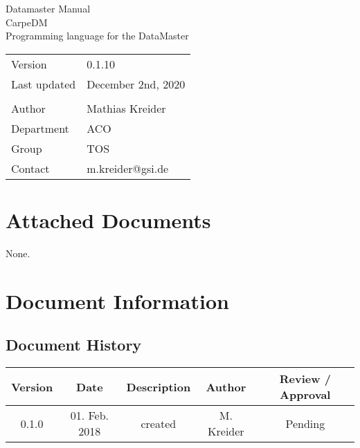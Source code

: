 \documentclass[12pt,a4paper]{report}
\makeatletter
\newcommand{\AppendixA}{dm_memmap}
\newcommand{\AppendixB}{dm_language}
\newcommand{\AppendixC}{dm_troubleshooting}
\newcommand{\DocAuthor}{Mathias Kreider}
\newcommand{\DocContact}{m.kreider@gsi.de}
\newcommand{\DocTitle}{CarpeDM\\Programming language for the DataMaster}
\newcommand{\DocName}{Datamaster Manual}
\newcommand{\DocRev}{December 2nd, 2020} %
\newcommand{\DocVer}{0.1.10}
\newcommand{\DocGroup}{TOS}
\newcommand{\DocDept}{ACO}
\newcommand{\DocHist}{
0.1.0 & 01. Feb. 2018 & created & M. Kreider & Pending\\
\hline
}
\makeatother
\begin{document}
\begin{titlepage}
\begin{center}
\vspace{2em} 

\Huge{\DocName}\\[2cm]
\Large{\DocTitle}\\[2cm] 

\begin{large}
\begin{tabularx}{\textwidth}{Xl}
Version & \DocVer\\
Last updated & \DocRev\\
\vspace{1.5cm}\\
Author & \DocAuthor\\
Department & \DocDept\\
Group & \DocGroup\\
Contact & \DocContact
\end{tabularx}%
\end{large}

\vfill

\end{center}
\end{titlepage}



%
%
%
\pagestyle{plain} %
\tableofcontents

\glsunsetall
\setcounter{chapter}{0}












\appendix
\renewcommand{\thechapter}{\Roman{chapter}}
\chapter{Attached Documents}
None.
\begingroup
\raggedright
\sloppy
\printbibliography[heading=bibnumbered]
\endgroup
\chapter{Document Information}
\section{Document History}
\begin{table}[H]
\begin{tabular}{ | c | c | c | c | c |}
\hline
\textbf{Version} & \textbf{Date} & \textbf{Description} & \textbf{Author} & \textbf{Review / Approval} \\
\hline
\DocHist
\hline
\end{tabular}
\end{table}
\end{document}
